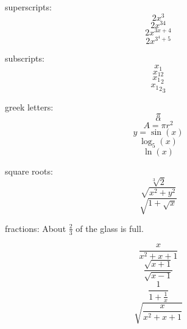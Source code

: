 \documentclass[11pt]{article}
\begin{document}
superscripts: $$2x^3$$
$$2x^{34}$$
$$2x^{3x+4}$$
$$2x^{3^4+5}$$

subscripts:
$$x_1$$
$$x_{12}$$
$${x_1}_2$$
$${{x_1}_2}_3$$

greek letters:
$$\pi$$
$$\alpha$$
$$A=\pi r^2$$
$$y=\sin(x)$$
$$\log_5(x)$$
$$\ln(x)$$

square roots:
$$\sqrt[3]{2}$$
$$\sqrt{x^2 + y^2}$$
$$\sqrt{1+\sqrt{x}}$$

fractions:
About $\displaystyle{\frac{2}{3}}$ of the glass is full.

$$\frac{x}{x^2+x+1}$$
$$\frac{\sqrt{x+1}}{\sqrt{x-1}}$$
$$\frac{1}{1+\frac{1}{x}}$$
$$\sqrt{\frac{x}{x^2+x+1}}$$
\end{document}

